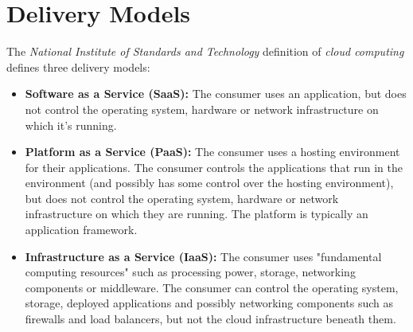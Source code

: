 \section{Delivery Models}
The \emph{National Institute of Standards and Technology} definition of \emph{cloud computing} defines three delivery models:
\begin{itemize}
  \item {\bf Software as a Service (SaaS):} The consumer uses an application, but does not control the operating system, hardware or 
        network infrastructure on which it's running.
  \item {\bf Platform as a Service (PaaS):} The consumer uses a hosting environment for their applications. The consumer controls the 
        applications that run in the environment (and possibly has some control over the hosting environment), but does not control the 
        operating system, hardware or network infrastructure on which they are running. The platform is typically an application framework.        
  \item {\bf Infrastructure as a Service (IaaS):} The consumer uses "fundamental computing resources" such as processing power, storage, 
        networking components or middleware. The consumer can control the operating system, storage, deployed applications and possibly 
        networking components such as firewalls and load balancers, but not the cloud infrastructure beneath them.
\end{itemize}

